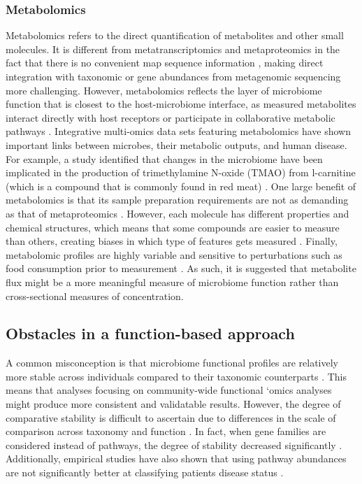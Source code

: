 \subsubsection{Metabolomics}
Metabolomics refers to the direct quantification of metabolites and other small molecules. It is different from  metatranscriptomics and metaproteomics in the fact that there is no convenient map sequence information \cite{franzosa2015sequencing}, making direct integration with taxonomic or gene abundances from metagenomic sequencing more challenging. However, metabolomics reflects the layer of microbiome function that is closest to the host-microbiome interface, as measured metabolites interact directly with host receptors or participate in collaborative metabolic pathways \cite{tang2011microbial}. Integrative multi-omics data sets featuring metabolomics have shown important links between microbes, their metabolic outputs, and human disease. For example, a study identified that changes in the microbiome have been implicated in the production of trimethylamine N-oxide (TMAO) from l-carnitine (which is a compound that is commonly found in red meat) \cite{wang2011gut}. One large benefit of metabolomics is that its sample preparation requirements are not as demanding as that of metaproteomics \cite{franzosa2019gut, verberkmoes2009shotgun}. However, each molecule has different properties and chemical structures, which means that some compounds are easier to measure than others, creating biases in which type of features gets measured \cite{tang2011microbial}. Finally, metabolomic profiles are highly variable and sensitive to perturbations such as food consumption prior to measurement \cite{hollywood2006metabolomics}. As such, it is suggested that metabolite flux might be a more meaningful measure of microbiome function rather than cross-sectional measures of concentration.  


\subsection{Obstacles in a function-based approach} 

A common misconception is that microbiome functional profiles are relatively more stable across individuals compared to their taxonomic counterparts \cite{consortium2012structure}. This means that analyses focusing on community-wide functional `omics analyses might produce more consistent and validatable results. However, the degree of comparative stability is difficult to ascertain due to differences in the scale of comparison across taxonomy and function \cite{langille2018exploring}. In fact, when gene families are considered instead of pathways, the degree of stability decreased significantly \cite{inkpen2017coupling}. Additionally, empirical studies have also shown that using pathway abundances are not significantly better at classifying patients disease status \cite{xu2014which}.   

